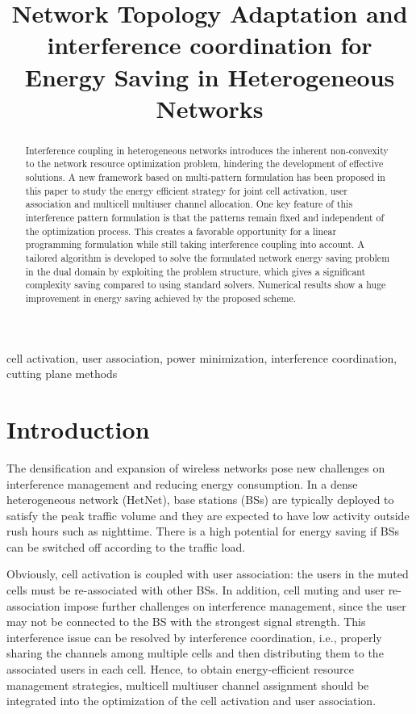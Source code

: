 \documentclass{article}
\title{Network Topology Adaptation and interference coordination for Energy Saving in Heterogeneous Networks}
\begin{document}
\ninept
\maketitle
\begin{abstract}
  Interference coupling in heterogeneous networks introduces the
  inherent non-convexity to the network resource optimization problem,
  hindering the development of effective solutions. A new framework
  based on multi-pattern formulation has been proposed in this paper
  to study the energy efficient strategy for joint cell activation,
  user association and multicell multiuser channel allocation. One key
  feature of this interference pattern formulation is that the
  patterns remain fixed and independent of the optimization
  process. This creates a favorable opportunity for a linear
  programming formulation while still taking interference coupling
  into account.  A tailored algorithm is developed to solve the
  formulated network energy saving problem in the dual domain by
  exploiting the problem structure, which gives a significant
  complexity saving compared to using standard solvers. Numerical
  results show a huge improvement in energy saving achieved by the
  proposed scheme.
\end{abstract}
\begin{keywords}
cell activation, user association, power minimization, interference
coordination, cutting plane methods
\end{keywords}
\section{Introduction}
\label{sec:intro}

The densification and expansion of wireless networks pose new
challenges on interference management and reducing energy
consumption. In a dense heterogeneous network (HetNet), base stations
(BSs) are typically deployed to satisfy the peak traffic volume and
they are expected to have low activity outside rush hours such as
nighttime. There is a high potential for energy saving if BSs can be
switched off according to the traffic load.

Obviously, cell activation is coupled with user association: the users
in the muted cells must be re-associated with other BSs. In addition,
cell muting and user re-association impose further challenges on
interference management, since the user may not be connected to the BS
with the strongest signal strength. This interference issue can be
resolved by interference coordination, i.e., properly sharing the
channels among multiple cells and then distributing them to the
associated users in each cell. Hence, to obtain energy-efficient
resource management strategies, multicell multiuser channel assignment
should be integrated into the optimization of the cell activation and
user association.
\end{document}
